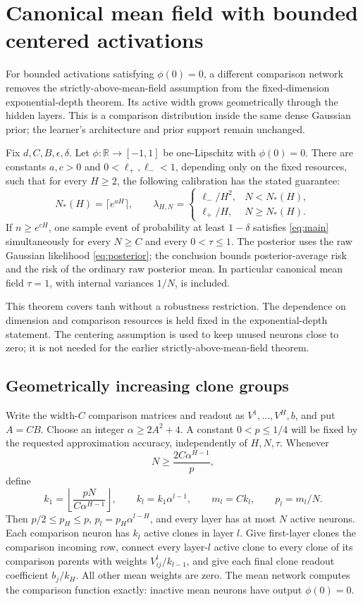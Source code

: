 \section{Canonical mean field with bounded centered activations}
\label{sec:geometric-clones}
For bounded activations satisfying $\phi(0)=0$, a different comparison network removes the strictly-above-mean-field assumption from the fixed-dimension exponential-depth theorem. Its active width grows geometrically through the hidden layers. This is a comparison distribution inside the same dense Gaussian prior; the learner's architecture and prior support remain unchanged.

\begin{theorem}
\label{thm:geometric-depth}
Fix $d,C,B,\epsilon,\delta$. Let $\phi:\mathbb R\to[-1,1]$ be one-Lipschitz with $\phi(0)=0$. There are constants $a,c>0$ and $0<\ell_+,\ell_-<1$, depending only on the fixed resources, such that for every $H\ge2$, the following calibration has the stated guarantee:
\[
 N_*(H)=\lceil e^{aH}\rceil,\qquad
 \lambda_{H,N}=
 \begin{cases}\ell_-/H^2,&N<N_*(H),\\
 \ell_+/H,&N\ge N_*(H).
 \end{cases}
\]
If $n\ge e^{cH}$, one sample event of probability at least $1-\delta$ satisfies \eqref{eq:main} simultaneously for every $N\ge C$ and every $0<\tau\le1$. The posterior uses the raw Gaussian likelihood \eqref{eq:posterior}; the conclusion bounds posterior-average risk and the risk of the ordinary raw posterior mean. In particular canonical mean field $\tau=1$, with internal variances $1/N$, is included.
\end{theorem}

This theorem covers tanh without a robustness restriction. The dependence on dimension and comparison resources is held fixed in the exponential-depth statement. The centering assumption is used to keep unused neurons close to zero; it is not needed for the earlier strictly-above-mean-field theorem.

\subsection{Geometrically increasing clone groups}
Write the width-$C$ comparison matrices and readout as $V^1,\ldots,V^H,b$, and put $A=CB$. Choose an integer
$\alpha\ge2A^2+4$. A constant $0<p\le1/4$ will be fixed by the requested approximation accuracy, independently of $H,N,\tau$. Whenever
\[
 N\ge\frac{2C\alpha^{H-1}}p,
\]
define
\[
 k_1=\left\lfloor\frac{pN}{C\alpha^{H-1}}\right\rfloor,
 \qquad k_l=k_1\alpha^{l-1},\qquad
 m_l=Ck_l,\qquad p_l=m_l/N.
\]
Then $p/2\le p_H\le p$, $p_l=p_H\alpha^{l-H}$, and every layer has at most $N$ active neurons. Each comparison neuron has $k_l$ active clones in layer $l$. Give first-layer clones the comparison incoming row, connect every layer-$l$ active clone to every clone of its comparison parents with weights $V^l_{ij}/k_{l-1}$, and give each final clone readout coefficient $b_j/k_H$. All other mean weights are zero. The mean network computes the comparison function exactly: inactive mean neurons have output $\phi(0)=0$.

